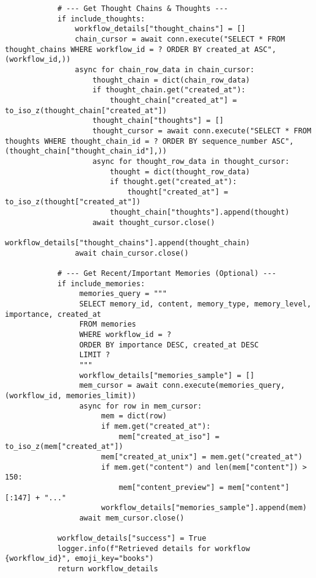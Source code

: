 \documentclass[12pt,a4paper]{article}
\begin{document}
\begin{pageablecode}
\begin{verbatim}
            # --- Get Thought Chains & Thoughts ---
            if include_thoughts:
                workflow_details["thought_chains"] = []
                chain_cursor = await conn.execute("SELECT * FROM thought_chains WHERE workflow_id = ? ORDER BY created_at ASC", (workflow_id,))
                async for chain_row_data in chain_cursor:
                    thought_chain = dict(chain_row_data)
                    if thought_chain.get("created_at"):
                        thought_chain["created_at"] = to_iso_z(thought_chain["created_at"])
                    thought_chain["thoughts"] = []
                    thought_cursor = await conn.execute("SELECT * FROM thoughts WHERE thought_chain_id = ? ORDER BY sequence_number ASC", (thought_chain["thought_chain_id"],))
                    async for thought_row_data in thought_cursor:
                        thought = dict(thought_row_data)
                        if thought.get("created_at"):
                            thought["created_at"] = to_iso_z(thought["created_at"])
                        thought_chain["thoughts"].append(thought)
                    await thought_cursor.close()
                    workflow_details["thought_chains"].append(thought_chain)
                await chain_cursor.close()

            # --- Get Recent/Important Memories (Optional) ---
            if include_memories:
                 memories_query = """
                 SELECT memory_id, content, memory_type, memory_level, importance, created_at
                 FROM memories
                 WHERE workflow_id = ?
                 ORDER BY importance DESC, created_at DESC
                 LIMIT ?
                 """
                 workflow_details["memories_sample"] = []
                 mem_cursor = await conn.execute(memories_query, (workflow_id, memories_limit))
                 async for row in mem_cursor:
                      mem = dict(row)
                      if mem.get("created_at"):
                          mem["created_at_iso"] = to_iso_z(mem["created_at"])
                      mem["created_at_unix"] = mem.get("created_at") 
                      if mem.get("content") and len(mem["content"]) > 150:
                          mem["content_preview"] = mem["content"][:147] + "..."
                      workflow_details["memories_sample"].append(mem)
                 await mem_cursor.close()

            workflow_details["success"] = True
            logger.info(f"Retrieved details for workflow {workflow_id}", emoji_key="books")
            return workflow_details


\end{verbatim}
\end{pageablecode}
\end{document}
